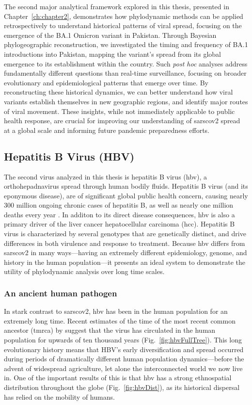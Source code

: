 The second major analytical framework explored in this thesis, presented in Chapter~\ref{ch:chapter2}, demonstrates how phylodynamic methods can be applied retrospectively to understand historical patterns of viral spread, focusing on the emergence of the BA.1 Omicron variant in Pakistan.
Through Bayesian phylogeographic reconstruction, we investigated the timing and frequency of BA.1 introductions into Pakistan, mapping the variant's spread from its global emergence to its establishment within the country.
Such \textit{post hoc} analyses address fundamentally different questions than real-time surveillance, focusing on broader evolutionary and epidemiological patterns that emerge over time.
By reconstructing these historical dynamics, we can better understand how viral variants establish themselves in new geographic regions, and identify major routes of viral movement.
These insights, while not immediately applicable to public health response, are crucial for improving our understanding of \gls{sarscov2} spread at a global scale and informing future pandemic preparedness efforts.

\subsection{Hepatitis B Virus (HBV)}
The second virus analyzed in this thesis is hepatitis B virus (\gls{hbv}), a orthohepadnavirus spread through human bodily fluids.
Hepatitis B virus (and its eponymous disease), are of significant global public health concern, causing nearly 300 million ongoing chronic cases of hepatitis B, as well as nearly one million deaths every year \citep{revill2020evolution}.
In additon to its direct disease consequences, \gls{hbv} is also a primary driver of the liver cancer hepatocellular carcinoma (\gls{hcc}).
Hepatitis B virus is characterized by several genotypes that are genetically distinct, and drive differences in both virulence and response to treatment.
Because \gls{hbv} differs from \gls{sarscov2} in many ways---having an extremely different epidemiology, genome, and history in the human population---it presents an ideal system to demonstrate the utility of phylodynamic analysis over long time scales.

\subsubsection{An ancient human pathogen}
In stark contrast to \gls{sarscov2}, \gls{hbv} has been in the human population for an extremely long time.
Recent estimates of the time of the most recent common ancestor (\gls{tmrca}) by \citet{kocher2021ten} suggest that the virus has circulated in the human population for upwards of ten thousand years (Fig.~\ref{fig:hbvFullTree}).
This long evolutionary history means that HBV's early diversification and spread occurred during periods of dramatically different human population dynamics---before the advent of widespread agriculture, let alone the interconnected world we now live in. 
One of the important results of this is that \gls{hbv} has a strong ethnospatial distribution throughout the globe (Fig.~\ref{fig:hbvDist}), as its historical dispersal has relied on the mobility of humans.


